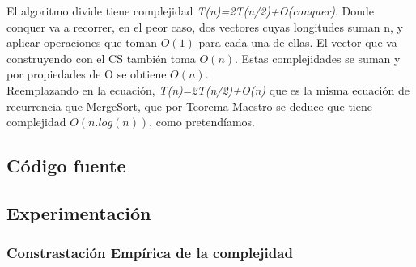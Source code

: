 El algoritmo divide tiene complejidad \emph{T(n)=2T(n/2)+O(conquer)}. Donde conquer va a recorrer, en el peor caso, dos vectores cuyas longitudes suman n, y aplicar operaciones que toman $O(1)$ para cada una de ellas. El vector que va construyendo con el CS tambi\'en toma $O(n)$. Estas complejidades se suman y por propiedades de O se obtiene $O(n)$.\\

Reemplazando en la ecuaci\'on, \emph{T(n)=2T(n/2)+O(n)} que es la misma ecuaci\'on de recurrencia que MergeSort, que por Teorema Maestro se deduce que tiene complejidad $O(n.log(n))$, como pretend\'iamos.

\newpage
\subsection{C\'odigo fuente}
\newpage
\subsection{Experimentaci\'on}

\subsubsection*{Constrastaci\'on Emp\'irica de la complejidad}

